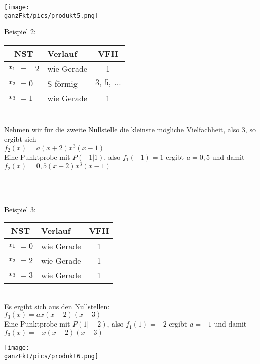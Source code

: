 \begin{minipage}{\linewidth}
	\begin{minipage}{0.5\linewidth}
		\texttt{[image: \\ganzFkt/pics/produkt5.png]}
	\end{minipage}
	{\color{loes}\begin{minipage}{0.5\linewidth}
			\textcolor{black}{Beispiel 2:}\\
			\begin{tabular}{rllc}
				\multicolumn{2}{c}{NST}&Verlauf&VFH\\
				\midrule
				\(x_1\hspace{-0.3cm}\)&\(=-2\)&wie Gerade&1\\
				\(x_2\hspace{-0.3cm}\)&\(=0\)&S-förmig&\(3,\ 5,\ \dots\)\\
				\(x_3\hspace{-0.3cm}\)&\(=1\)&wie Gerade&1
			\end{tabular}\\
			Nehmen wir für die zweite Nullstelle die kleinste mögliche Vielfachheit, also 3, so ergibt sich\\
			\(f_2(x)=a\left(x+2\right)x^3 \left(x-1\right) \)\\
			Eine Punktprobe mit \(P(-1\vert 1)\), also \(f_1(-1)=1\) ergibt \(a=0,5\) und damit\\
			\(f_2(x)=0,5\left(x+2\right)x^3 \left(x-1\right) \)
	\end{minipage}}
\end{minipage}\\ \vspace{.15cm}\\
\begin{minipage}{\linewidth}
	{\color{loes}\begin{minipage}{0.5\linewidth}
			\textcolor{black}{Beispiel 3:}\\
			\begin{tabular}{rllc}
				\multicolumn{2}{c}{NST}&Verlauf&VFH\\
				\midrule
				\(x_1\hspace{-0.3cm}\)&\(=0\)&wie Gerade&1\\
				\(x_2\hspace{-0.3cm}\)&\(=2\)&wie Gerade&1\\
				\(x_3\hspace{-0.3cm}\)&\(=3\)&wie Gerade&1
			\end{tabular}\\
			Es ergibt sich aus den Nullstellen:\\
			\(f_3(x)=ax \left(x-2\right) \left(x-3\right) \)\\
			Eine Punktprobe mit \(P(1\vert-2)\), also \(f_1(1)=-2\) ergibt \(a=-1\) und damit\\
			\(f_3(x)=-x \left(x-2\right) \left(x-3\right) \)
	\end{minipage}}
	\begin{minipage}{0.5\linewidth}
		\texttt{[image: \\ganzFkt/pics/produkt6.png]}
	\end{minipage}
\end{minipage}
